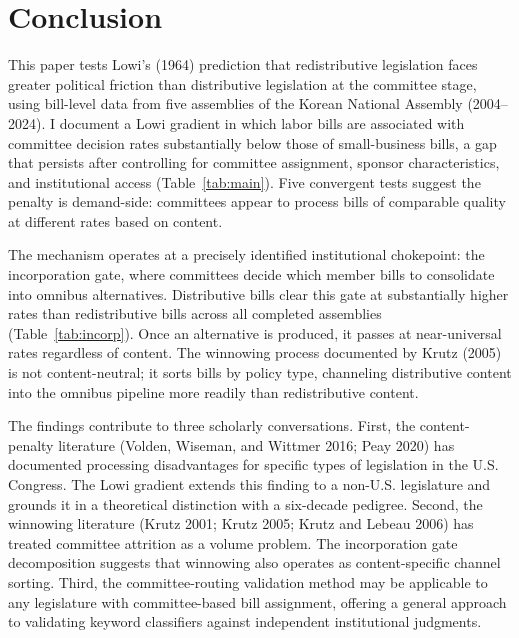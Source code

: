 \documentclass[11pt]{article}
\begin{document}

\section{Conclusion}
\label{sec:conclusion}

This paper tests Lowi's (1964) prediction that redistributive legislation faces greater political friction than distributive legislation at the committee stage, using bill-level data from five assemblies of the Korean National Assembly (2004--2024). I document a Lowi gradient in which labor bills are associated with committee decision rates substantially below those of small-business bills, a gap that persists after controlling for committee assignment, sponsor characteristics, and institutional access (Table~\ref{tab:main}). Five convergent tests suggest the penalty is demand-side: committees appear to process bills of comparable quality at different rates based on content.

The mechanism operates at a precisely identified institutional chokepoint: the incorporation gate, where committees decide which member bills to consolidate into omnibus alternatives. Distributive bills clear this gate at substantially higher rates than redistributive bills across all completed assemblies (Table~\ref{tab:incorp}). Once an alternative is produced, it passes at near-universal rates regardless of content. The winnowing process documented by Krutz (2005) is not content-neutral; it sorts bills by policy type, channeling distributive content into the omnibus pipeline more readily than redistributive content.

The findings contribute to three scholarly conversations. First, the content-penalty literature (Volden, Wiseman, and Wittmer 2016; Peay 2020) has documented processing disadvantages for specific types of legislation in the U.S. Congress. The Lowi gradient extends this finding to a non-U.S. legislature and grounds it in a theoretical distinction with a six-decade pedigree. Second, the winnowing literature (Krutz 2001; Krutz 2005; Krutz and Lebeau 2006) has treated committee attrition as a volume problem. The incorporation gate decomposition suggests that winnowing also operates as content-specific channel sorting. Third, the committee-routing validation method may be applicable to any legislature with committee-based bill assignment, offering a general approach to validating keyword classifiers against independent institutional judgments.
\end{document}
